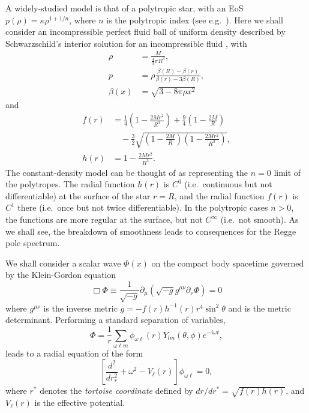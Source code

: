\documentclass[aps,prd,longbibliography,reprint,twocolumn,amsmath,amssymb,amsfonts,showpacs,superscriptaddress]{revtex4-1}%
\newcommand{\nn}{\nonumber}
\begin{document}
A widely-studied model is that of a polytropic star, with an EoS $p(\rho) = \kappa \rho^{1+1/n}$, where $n$ is the polytropic index (see e.g.~\cite{Stratton:2019deq}). Here we shall consider an incompressible perfect fluid ball of uniform density described by Schwarzschild's interior solution for an incompressible fluid \cite{Shapiro1983}, with
\begin{subequations}
\begin{align}
\rho &= \frac{M}{\frac{4}{3} \pi R^3} , \\
p &= \rho \frac{\beta(R) - \beta(r)}{ \beta(r) - 3 \beta(R)} , \\
\beta(x) &= \sqrt{3 - 8 \pi \rho x^2}
\end{align}
\end{subequations}
and
%
\begin{subequations}\label{Interior_Solution}
\begin{align}\label{Interior_Solution_f}
 f(r) &= \frac{1}{4}\left(1-\frac{2 M r^2}{R^3}\right)+\frac{9}{4}\left(1-\frac{2M}{R}\right) \nn \\ 
       & \quad -\frac{3}{2} \sqrt{\left(1-\frac{2M}{R}\right)\left(1-\frac{2 M r^2}{R^3}\right)}, \\
 h(r) &= 1-\frac{2 M r^2}{R^3} . \label{Interior_Solution_h}
\end{align}
\end{subequations}
The constant-density model can be thought of as representing the $n=0$ limit of the polytropes. 
The radial function $h(r)$ is $C^0$ (i.e.~continuous but not differentiable) at the surface of the star $r=R$, and the radial function $f(r)$ is $C^1$ there (i.e.~once but not twice differentiable). In the polytropic cases $n > 0$, the functions are more regular at the surface, but not $C^\infty$ (i.e.~not smooth). As we shall see, the breakdown of smoothness leads to consequences for the Regge pole spectrum. 

We shall consider a scalar wave $\Phi(x)$ on the compact body spacetime governed by the Klein-Gordon equation
\begin{equation}
\Box \Phi \equiv \frac{1}{\sqrt{-g}} \partial_{\mu} \left( \sqrt{-g} g^{\mu \nu} \partial_{\nu} \Phi \right) = 0
\end{equation}
where $g^{\mu \nu}$ is the inverse metric 
$
g = - f(r) h^{-1}(r) r^4 \sin^2 \theta
$
and is the metric determinant. Performing a standard separation of variables,
\begin{equation}
\Phi = \frac{1}{r} \sum_{\omega \ell m} \phi_{\omega \ell}(r)  Y_{lm}(\theta, \phi) e^{-i \omega t} ,
\end{equation}
leads to a radial equation of the form
\begin{equation}
\label{H_Radial_equation}
\left[\frac{d^{2}}{dr_{\ast}^{2}}+\omega^{2}-V_{\ell}(r)\right]\phi_{\omega\ell}= 0,
\end{equation}
where $r^\ast$ denotes the \emph{tortoise coordinate} defined by  $dr/dr^\ast =\sqrt{f(r)h(r)}$, and $V_{\ell}(r)$
is the effective potential. 
\end{document}
